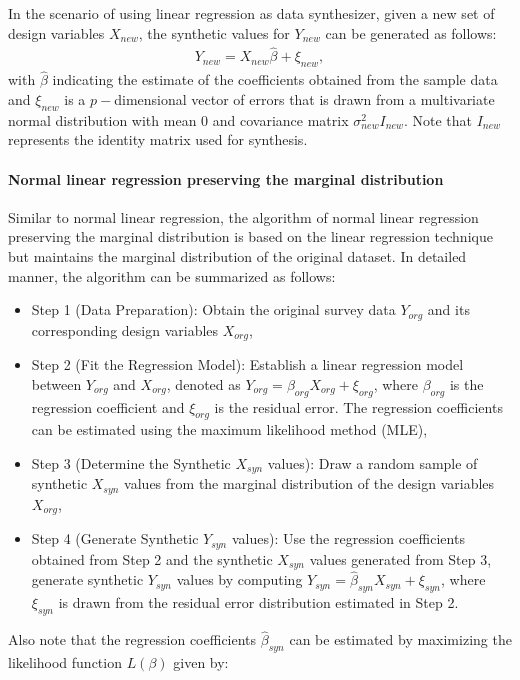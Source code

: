 In the scenario of using linear regression as data synthesizer, given a new set of design variables $X_{new}$, the synthetic values for $Y_{new}$ can be generated as follows:
\begin{align}
    \label{equ:lm-syn}
    Y_{new}=X_{new}\hat{\beta}+\xi_{new},
\end{align}
with $\hat{\beta}$ indicating the estimate of the coefficients obtained from the sample data and $\xi_{new}$ is a $p-$dimensional vector of errors that is drawn from a multivariate normal distribution with mean $0$ and covariance matrix $\sigma_{new}^2I_{new}$. Note that $I_{new}$ represents the identity matrix used for synthesis.

\paragraph{Normal linear regression preserving the marginal distribution}
Similar to normal linear regression, the algorithm of normal linear regression preserving the marginal distribution is based on the linear regression technique but maintains the marginal distribution of the original dataset. In detailed manner, the algorithm can be summarized as follows:
\begin{itemize}
    \item Step 1 (Data Preparation): Obtain the original survey data $Y_{org}$ and its corresponding design variables $X_{org}$,
    \item Step 2 (Fit the Regression Model): Establish a linear regression model between $Y_{org}$ and $X_{org}$, denoted as $Y_{org} = \beta_{org}X_{org} + \xi_{org}$, where $\beta_{org}$ is the regression coefficient and $\xi_{org}$ is the residual error. The regression coefficients can be estimated using the maximum likelihood method (MLE),
    \item Step 3 (Determine the Synthetic $X_{syn}$ values): Draw a random sample of synthetic $X_{syn}$ values from the marginal distribution of the design variables $X_{org}$,
    \item Step 4 (Generate Synthetic $Y_{syn}$ values): Use the regression coefficients obtained from Step 2 and the synthetic $X_{syn}$ values generated from Step 3, generate synthetic $Y_{syn}$ values by computing $Y_{syn} = \hat{\beta}_{syn}X_{syn} + \xi_{syn}$, where $\xi_{syn}$ is drawn from the residual error distribution estimated in Step 2.
\end{itemize}
Also note that the regression coefficients $\hat{\beta}_{syn}$ can be estimated by maximizing the likelihood function $L(\beta)$ given by:
